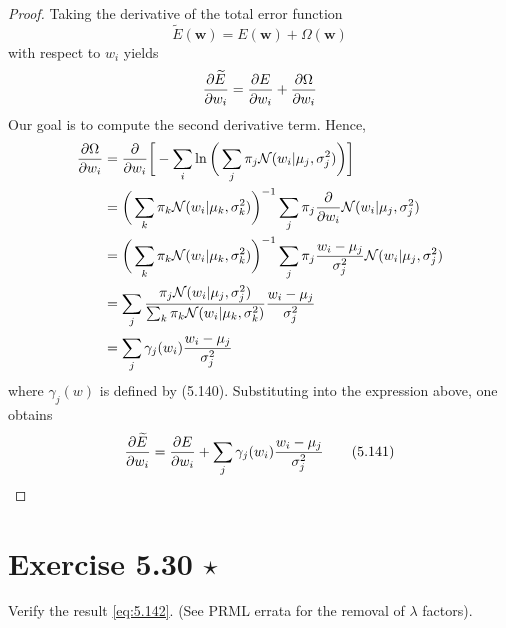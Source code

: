 \begin{proof}

    Taking the derivative of the total error function 
    \begin{equation*}
        \widetilde{E}(\mathbf{w}) = E(\mathbf{w}) + \Omega(\mathbf{w})
        \tag{5.139}\label{eq:5.139}
    \end{equation*}
    with respect to $w_i$ yields
    \begin{align*}
        \pdv{\widetilde{E}}{w_i} = \pdv{E}{w_i} + \pdv{\Omega}{w_i}
    \end{align*}
    Our goal is to compute the second derivative term. Hence,
    \begin{align*}
        \pdv{\Omega}{w_i} 
        &= \pdv{w_i} \bigg[-\sum_{i}^{} \ln\bigg(\sum_{j}^{} \pi_j \mathcal{N}(w_i | \mu_j, \sigma_j^2)\bigg)\bigg] \\
        &= \bigg(\sum_{k}^{} \pi_k \mathcal{N}(w_i | \mu_k, \sigma_k^2)\bigg)^{-1}
            \sum_{j}^{} \pi_j \pdv{w_i} \mathcal{N}(w_i | \mu_j, \sigma_j^2) \\
        &= \bigg(\sum_{k}^{} \pi_k \mathcal{N}(w_i | \mu_k, \sigma_k^2)\bigg)^{-1}
            \sum_{j}^{} \pi_j \frac{w_i - \mu_j}{\sigma_j^2} \mathcal{N}(w_i | \mu_j, \sigma_j^2) \\
        &= \sum_{j}^{} \frac{\pi_j \mathcal{N}(w_i | \mu_j, \sigma_j^2)} 
            {\sum_{k}^{} \pi_k \mathcal{N}(w_i | \mu_k, \sigma_k^2)} \frac{w_i - \mu_j}{\sigma_j^2} \\
        &= \sum_{j}^{} \gamma_j(w_i) \frac{w_i - \mu_j}{\sigma_j^2}
    \end{align*}
    where $\gamma_j(w)$ is defined by (5.140). 
    Substituting into the expression above, one obtains
    \begin{equation*}
        \pdv{\widetilde{E}}{w_i} = \pdv{E}{w_i} 
        + \sum_{j}^{} \gamma_j(w_i) \frac{w_i - \mu_j}{\sigma_j^2}
        \tag{5.141}\label{eq:5.141}
    \end{equation*}
\end{proof}

\section*{Exercise 5.30 $\star$}
Verify the result \eqref{eq:5.142}. (See PRML errata for the removal of $\lambda$ factors).

\vspace{1em}


